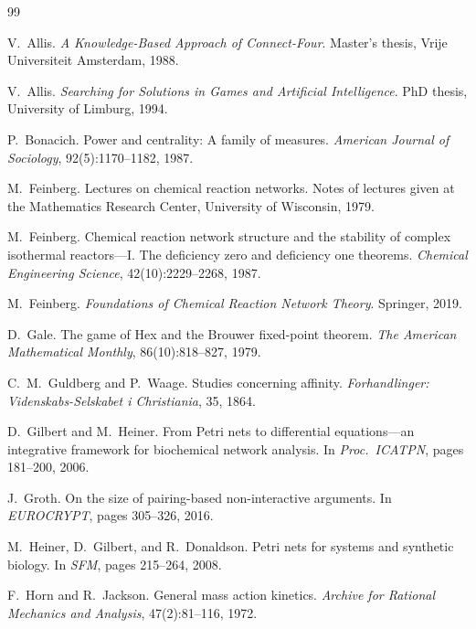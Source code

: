\documentclass[11pt,a4paper]{article}
\begin{document}
\begin{thebibliography}{99}

V.~Allis.
\newblock \emph{A Knowledge-Based Approach of Connect-Four}.
\newblock Master's thesis, Vrije Universiteit Amsterdam, 1988.

V.~Allis.
\newblock \emph{Searching for Solutions in Games and Artificial Intelligence}.
\newblock PhD thesis, University of Limburg, 1994.

P.~Bonacich.
\newblock Power and centrality: A family of measures.
\newblock \emph{American Journal of Sociology}, 92(5):1170--1182, 1987.

M.~Feinberg.
\newblock Lectures on chemical reaction networks.
\newblock Notes of lectures given at the Mathematics Research Center, University of Wisconsin, 1979.

M.~Feinberg.
\newblock Chemical reaction network structure and the stability of complex isothermal reactors---I. The deficiency zero and deficiency one theorems.
\newblock \emph{Chemical Engineering Science}, 42(10):2229--2268, 1987.

M.~Feinberg.
\newblock \emph{Foundations of Chemical Reaction Network Theory}.
\newblock Springer, 2019.

D.~Gale.
\newblock The game of Hex and the Brouwer fixed-point theorem.
\newblock \emph{The American Mathematical Monthly}, 86(10):818--827, 1979.

C.~M.~Guldberg and P.~Waage.
\newblock Studies concerning affinity.
\newblock \emph{Forhandlinger: Videnskabs-Selskabet i Christiania}, 35, 1864.

D.~Gilbert and M.~Heiner.
\newblock From Petri nets to differential equations---an integrative framework for biochemical network analysis.
\newblock In \emph{Proc.\ ICATPN}, pages 181--200, 2006.

J.~Groth.
\newblock On the size of pairing-based non-interactive arguments.
\newblock In \emph{EUROCRYPT}, pages 305--326, 2016.

M.~Heiner, D.~Gilbert, and R.~Donaldson.
\newblock Petri nets for systems and synthetic biology.
\newblock In \emph{SFM}, pages 215--264, 2008.

F.~Horn and R.~Jackson.
\newblock General mass action kinetics.
\newblock \emph{Archive for Rational Mechanics and Analysis}, 47(2):81--116, 1972.


\end{thebibliography}
\end{document}
